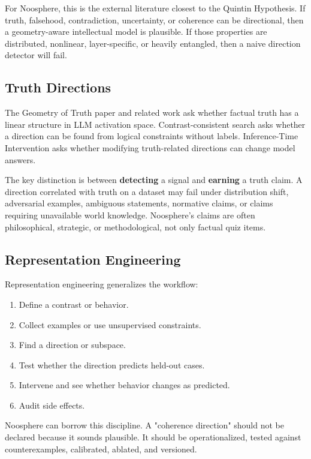 \documentclass[11pt]{article}
\begin{document}
For Noosphere, this is the external literature closest to the Quintin
Hypothesis. If truth, falsehood, contradiction, uncertainty, or coherence can be
directional, then a geometry-aware intellectual model is plausible. If those
properties are distributed, nonlinear, layer-specific, or heavily entangled,
then a naive direction detector will fail.

\subsection{Truth Directions}

The Geometry of Truth paper and related work ask whether factual truth has a
linear structure in LLM activation space. Contrast-consistent search asks
whether a direction can be found from logical constraints without labels.
Inference-Time Intervention asks whether modifying truth-related directions can
change model answers.

The key distinction is between \textbf{detecting} a signal and \textbf{earning}
a truth claim. A direction correlated with truth on a dataset may fail under
distribution shift, adversarial examples, ambiguous statements, normative
claims, or claims requiring unavailable world knowledge. Noosphere's claims are
often philosophical, strategic, or methodological, not only factual quiz items.

\subsection{Representation Engineering}

Representation engineering generalizes the workflow:

\begin{enumerate}
\item Define a contrast or behavior.
\item Collect examples or use unsupervised constraints.
\item Find a direction or subspace.
\item Test whether the direction predicts held-out cases.
\item Intervene and see whether behavior changes as predicted.
\item Audit side effects.
\end{enumerate}

Noosphere can borrow this discipline. A "coherence direction" should not be
declared because it sounds plausible. It should be operationalized, tested
against counterexamples, calibrated, ablated, and versioned.
\end{document}
